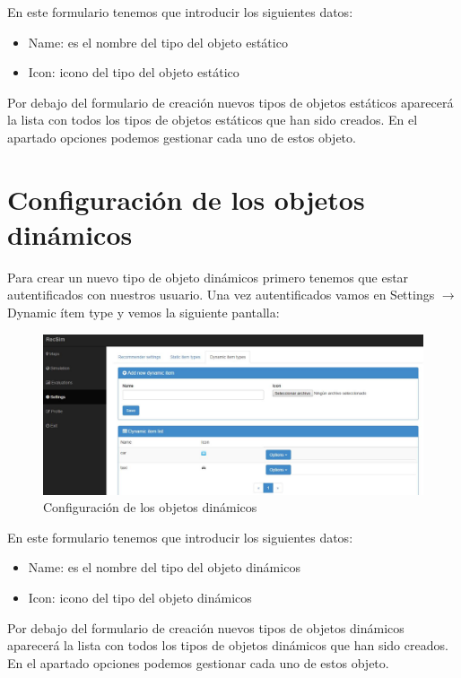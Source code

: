 En este formulario tenemos que introducir los siguientes datos:

\begin{itemize}
	\item Name: es el nombre del tipo del objeto estático
	\item Icon: icono del tipo del objeto estático
\end{itemize}	

Por debajo del formulario de creación nuevos tipos de objetos estáticos aparecerá la lista con todos los tipos de objetos estáticos que han sido creados. En el apartado opciones podemos gestionar cada uno de estos objeto.

\section{Configuración de los objetos dinámicos}\label{sec:confObjDinamicos}

Para crear un nuevo tipo de objeto dinámicos primero tenemos que estar autentificados con nuestros usuario. Una vez autentificados vamos en Settings $\rightarrow$ Dynamic ítem type y vemos la siguiente pantalla:

\begin{figure}[H]
	\centering\includegraphics[scale=0.35]{imagenes/capitulo4/config-objetos-dinamicos.jpg}
	\caption{Configuración de los objetos dinámicos}
	\label{img:ConfiguracionObjetosDinamicos}
\end{figure}

En este formulario tenemos que introducir los siguientes datos:

\begin{itemize}
	\item Name: es el nombre del tipo del objeto dinámicos
	\item Icon: icono del tipo del objeto dinámicos
\end{itemize}

Por debajo del formulario de creación nuevos tipos de objetos dinámicos aparecerá la lista con todos los tipos de objetos dinámicos que han sido creados. En el apartado opciones podemos gestionar cada uno de estos objeto.

